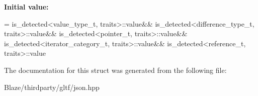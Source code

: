 {\bfseries Initial value\+:}
\begin{DoxyCode}
=
                is\_detected<value\_type\_t, traits>::value&&
                is\_detected<difference\_type\_t, traits>::value&&
                is\_detected<pointer\_t, traits>::value&&
                is\_detected<iterator\_category\_t, traits>::value&&
                is\_detected<reference\_t, traits>::value
\end{DoxyCode}


The documentation for this struct was generated from the following file\+:\begin{DoxyCompactItemize}
\item 
Blaze/thirdparty/gltf/json.\+hpp\end{DoxyCompactItemize}
